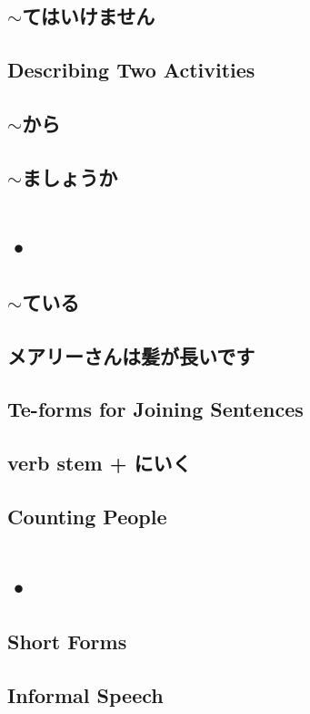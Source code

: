 \documentclass{article}
\begin{document}
   \subsection{$\sim$てはいけません}
   \subsection{Describing Two Activities}
   \subsection{$\sim$から}
   \subsection{$\sim$ましょうか}
   
   \newpage
   
   \section{•}
   \subsection{$\sim$ている}
   \subsection{メアリーさんは髪が長いです}
   \subsection{Te-forms for Joining Sentences}
   \subsection{verb stem + にいく}
   \subsection{Counting People}
   
   \newpage
   
   \section{•}
   \subsection{Short Forms}
   \subsection{Informal Speech}
\end{document}
